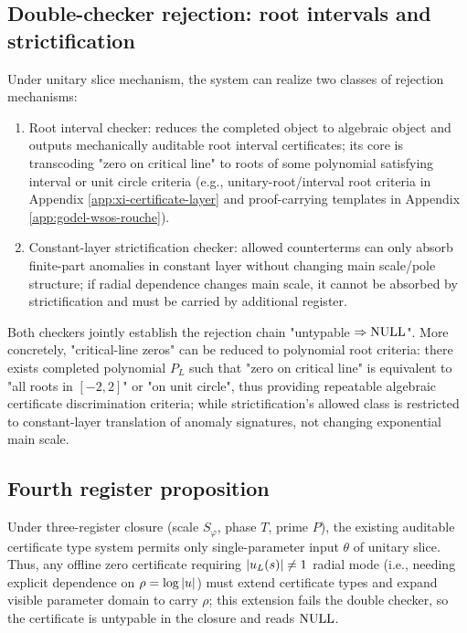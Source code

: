 \subsection{Double-checker rejection: root intervals and strictification}
Under unitary slice mechanism, the system can realize two classes of rejection mechanisms:
\begin{enumerate}
  \item Root interval checker: reduces the completed object to algebraic object and outputs mechanically auditable root interval certificates; its core is transcoding "zero on critical line" to roots of some polynomial satisfying interval or unit circle criteria (e.g., unitary-root/interval root criteria in Appendix \ref{app:xi-certificate-layer} and proof-carrying templates in Appendix \ref{app:godel-wsos-rouche}).
  \item Constant-layer strictification checker: allowed counterterms can only absorb finite-part anomalies in constant layer without changing main scale/pole structure; if radial dependence changes main scale, it cannot be absorbed by strictification and must be carried by additional register.
\end{enumerate}
Both checkers jointly establish the rejection chain "untypable $\Rightarrow \mathrm{NULL}$". More concretely, "critical-line zeros" can be reduced to polynomial root criteria: there exists completed polynomial $P_L$ such that "zero on critical line" is equivalent to "all roots in $[-2,2]$" or "on unit circle", thus providing repeatable algebraic certificate discrimination criteria; while strictification's allowed class is restricted to constant-layer translation of anomaly signatures, not changing exponential main scale.\par

\subsection{Fourth register proposition}
\begin{proposition}\label{prop:fourth-register-need}
Under three-register closure (scale $S_\varphi$, phase $T$, prime $P$), the existing auditable certificate type system permits only single-parameter input $\theta$ of unitary slice. Thus, any offline zero certificate requiring $\left\lvert u_L(s)\right\rvert\neq 1$ radial mode (i.e., needing explicit dependence on $\rho=\log\left\lvert u\right\rvert$) must extend certificate types and expand visible parameter domain to carry $\rho$; this extension fails the double checker, so the certificate is untypable in the closure and reads $\mathrm{NULL}$.\par
\end{proposition}

